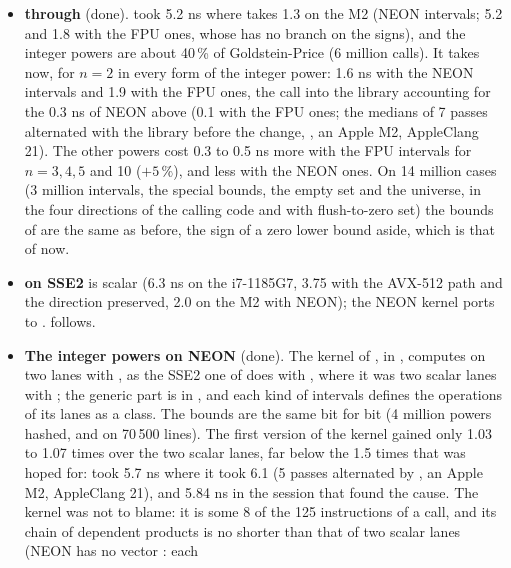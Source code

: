 \begin{itemize}
\item[$\bullet$] \textbf{ through } (done).
 took 5.2 ns where  takes 1.3 on the M2 (NEON
intervals; 5.2 and 1.8 with the FPU ones, whose  has no branch on
the signs), and the integer powers are about 40\,\% of Goldstein-Price (6
million calls). It takes  now, for $n = 2$ in every form of the
integer power:\newinvfive{} 1.6 ns with the NEON intervals and 1.9 with the
FPU ones, the call into the library accounting for the 0.3 ns of NEON above
 (0.1 with the FPU ones; the medians of 7 passes alternated with
the library before the change, , an Apple M2,
AppleClang 21). The other powers cost 0.3 to 0.5 ns more with the FPU
intervals for $n = 3, 4, 5$ and 10 ($+5\,\%$), and less with the NEON ones.
On 14 million cases (3 million intervals, the special bounds, the empty set
and the universe, in the four directions of the calling code and with
flush-to-zero set) the bounds of  are the same as before,
the sign of a zero lower bound aside, which is that of  now.
\item[$\bullet$] \textbf{ on SSE2} is scalar (6.3 ns on the
i7-1185G7, 3.75 with the AVX-512 path and the direction preserved, 2.0 on
the M2 with NEON); the NEON kernel ports to .
 follows.
\item[$\bullet$] \textbf{The integer powers on NEON} (done).
The kernel of , in ,
computes on two lanes with , as the SSE2 one of
 does with , where it was
two scalar lanes with ; the generic part is in
, and each kind of intervals defines the
operations of its lanes as a class.\newinvfive{} The bounds are the same bit
for bit (4 million powers hashed, and  on
70\,500 lines). The first version of the kernel gained only 1.03 to 1.07 times
over the two scalar lanes, far below the 1.5 times that was hoped for:
 took 5.7 ns where it took 6.1 (5 passes alternated by
, an Apple M2, AppleClang 21), and 5.84
ns in the session that found the cause. The kernel was not to blame: it is some
8 of the 125 instructions of a call, and its chain of dependent products is no
shorter than that of two scalar lanes (NEON has no vector : each

\end{itemize}
